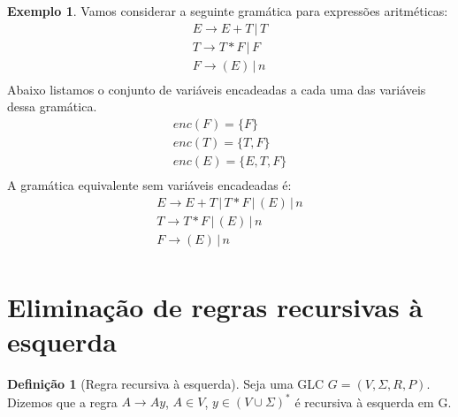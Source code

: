\documentclass[a4paper]{article}
\theoremstyle{definition}
\newtheorem{Example}{Exemplo}
\newtheorem{Definition}{Definição}
\begin{document}
  \begin{Example}
    Vamos considerar a seguinte gramática para expressões aritméticas:
    \[
      \begin{array}{l}
        E \to E + T \,|\, T\\
        T \to T * F \,|\, F \\
        F \to (E) \,|\, n \\
      \end{array}
    \]
    Abaixo listamos o conjunto de variáveis encadeadas a cada uma das variáveis
    dessa gramática.
    \[
      \begin{array}{l}
      enc(F) =\{F\} \\
      enc(T) = \{T,F\} \\
        enc(E) = \{E,T,F\}\\
      \end{array}
    \]
    A gramática equivalente sem variáveis encadeadas é:
    \[
      \begin{array}{l}
        E \to E + T \,|\, T*F \,|\, (E)\,|\,n\\
        T \to T * F \,|\, (E)\,|\,n \\
        F \to (E) \,|\, n \\
      \end{array}
    \]
  \end{Example}

  \section{Eliminação de regras recursivas à esquerda}

  \begin{Definition}[Regra recursiva à esquerda]
    Seja uma GLC $G = (V,\Sigma,R,P)$. Dizemos que a regra $A \to Ay$, $A\in V$,
    $y \in (V\cup \Sigma)^*$ é recursiva à esquerda em G.
  \end{Definition}
\end{document}
